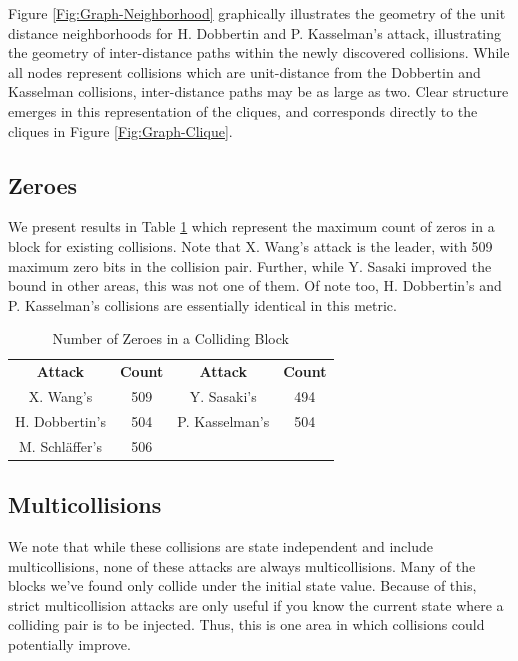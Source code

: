 \documentclass[conference]{IEEEtran}
\begin{document}
Figure \ref{Fig:Graph-Neighborhood} graphically illustrates the
geometry of the unit distance neighborhoods for H. Dobbertin and
P. Kasselman's attack, illustrating the geometry of inter-distance
paths within the newly discovered collisions.  While all nodes
represent collisions which are unit-distance from the Dobbertin and
Kasselman collisions, inter-distance paths may be as large as two.
Clear structure emerges in this representation of the cliques, and
corresponds directly to the cliques in Figure \ref{Fig:Graph-Clique}.

\subsection{Zeroes}

We present results in Table \ref{table:zeros} which represent the maximum count of zeros in a block
for existing collisions. Note that X. Wang's attack is the leader, with 509
maximum zero bits in the collision pair. Further, while Y. Sasaki improved
the bound in other areas, this was not one of them. Of note too,
H. Dobbertin's and P. Kasselman's collisions are essentially identical in
this metric.

\begin{table}
    \caption{Number of Zeroes in a Colliding Block}
    \label{table:zeros}
    \begin{tabular}{c c c c}
        \textbf{Attack} & \textbf{Count} & \textbf{Attack} & \textbf{Count} \\
        X. Wang's & 509 & Y. Sasaki's & 494 \\
        H. Dobbertin's & 504 & P. Kasselman's & 504 \\
        M. Schl{\"a}ffer's & 506 & & \\
    \end{tabular}
\end{table}

\subsection{Multicollisions}

We note that while these collisions are state independent and include
multicollisions, none of these attacks are always multicollisions. Many of the
blocks we've found only collide under the initial state value. Because of this,
strict multicollision attacks are only useful if you know the current state where a
colliding pair is to be injected. Thus, this is one area in which collisions
could potentially improve.
\end{document}
